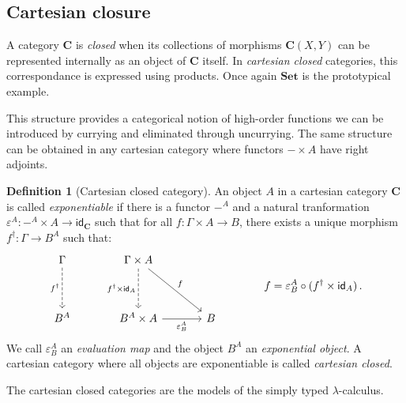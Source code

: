 \documentclass[11pt,oneside,draft]{book}
\theoremstyle{definition}
\newtheorem{definition}[theorem]{Definition}
\newcommand{\kw}[1]{\ensuremath{ \mathsf{#1} }}
\begin{document}

\subsection{Cartesian closure} %

A category $\mathbf{C}$ is \emph{closed} when
its collections of morphisms $\mathbf{C}(X, Y)$
can be represented internally as an object of $\mathbf{C}$ itself.
In \emph{cartesian closed} categories,
this correspondance is expressed using products.
Once again $\mathbf{Set}$ is the prototypical example.

This structure provides
a categorical notion of high-order functions
we can be introduced by currying
and eliminated through uncurrying.
The same structure can be obtained
in any cartesian category where functors
${-} \times A$
have right adjoints.

\begin{definition}[Cartesian closed category] %
An object $A$ in a cartesian category $\mathbf{C}$
is called \emph{exponentiable}
if there is a functor $-^A$ and a natural tranformation
$\varepsilon^A : -^A \times A \rightarrow \kw{id}_\mathbf{C}$
such that for all $f : \Gamma \times A \rightarrow B$,
there exists a unique morphism $f^\dagger : \Gamma \rightarrow B^A$
such that:
\[
  \begin{tikzcd}[row sep=huge, column sep=large]
    \Gamma \ar[d, "f^\dagger"', dashed] &
    \Gamma \times A
      \ar[d, "f^\dagger \times \kw{id}_A"', dashed]
      \ar[dr, "f"] &
    \\
    B^A &
    B^A \times A \ar[r, "\varepsilon^A_B"'] &
    B
  \end{tikzcd}
  \qquad \qquad
  f = \varepsilon^A_B \circ (f^\dagger \times \kw{id}_A)
  \,.
\]
We call $\varepsilon^A_B$ an \emph{evaluation map}
and the object $B^A$ an \emph{exponential object}.
A cartesian category
where all objects are exponentiable
is called \emph{cartesian closed}.
\end{definition}

The cartesian closed categories are the models
of the simply typed $\lambda$-calculus.
\end{document}
